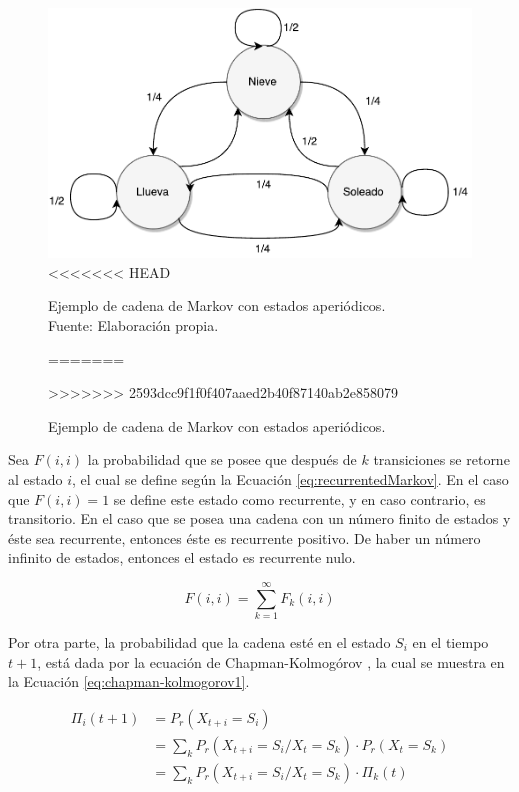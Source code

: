 \begin{figure}[ht!]
	\centering
	\includegraphics[scale=0.5]{images/EjCadenaMarkov-Aperiodica.pdf}
<<<<<<< HEAD
	\caption[Ejemplo de cadena de Markov con estados aperiódicos.]{Ejemplo de cadena de Markov con estados aperiódicos.\\Fuente: Elaboración propia.}
=======
	\caption{Ejemplo de cadena de Markov con estados aperi\'odicos.}
>>>>>>> 2593dcc9f1f0f407aaed2b40f87140ab2e858079
	\label{fig:ejCadenaMarkov-Aperiodica}
\end{figure}

\normalsize{Sea $F(i,i)$ la probabilidad que se posee que despu\'es de $k$ transiciones se retorne al estado $i$, el cual se define seg\'un la Ecuaci\'on} \ref{eq:recurrentedMarkov}. \normalsize{En el caso que $F(i,i)=1$ se define este estado como recurrente, y en caso contrario, es transitorio. En el caso que se posea una cadena con un n\'umero finito de estados y \'este sea recurrente, entonces \'este es recurrente positivo. De haber un n\'umero infinito de estados, entonces el estado es recurrente nulo.}

\begin{equation} \label{eq:recurrentedMarkov}
	F(i,i) = \sum_{k=1}^{\infty}{F_k(i,i)}
\end{equation}

Por otra parte, la probabilidad que la cadena est\'e en el estado $S_i$ en el tiempo $t+1$, est\'a dada por la ecuaci\'on de Chapman-Kolmog\'orov \citep{Papoulis1984}, la cual se muestra en la Ecuaci\'on \ref{eq:chapman-kolmogorov1}.

\begin{equation} \label{eq:chapman-kolmogorov1}
\begin{split}
	\Pi_{i} (t+1) &= P_r(X_{t+i}=S_i) \\
				  &= \sum _{k} P_r(X_{t+i} = S_i / X_t = S_k) \cdot P_r(X_t = S_k)\\
				  &= \sum _{k} P_r(X_{t+i} = S_i / X_t = S_k) \cdot \Pi_{k} (t)
\end{split}	
\end{equation}

